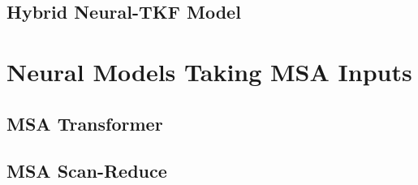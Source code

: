 \subsection{Hybrid Neural-TKF Model}


\section{Neural Models Taking MSA Inputs}


\subsection{MSA Transformer}


\subsection{MSA Scan-Reduce}




